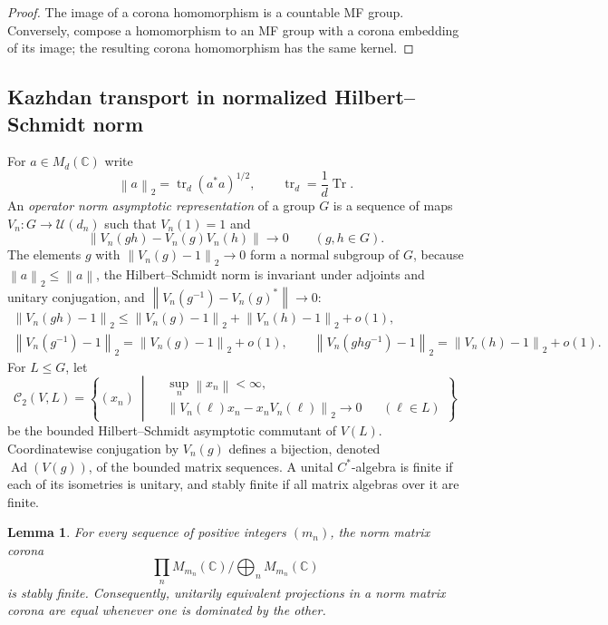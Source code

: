 \documentclass[11pt]{amsart}
\newcommand{\leanverified}[2]{\ignorespaces}
\newtheorem{lemma}[theorem]{Lemma}
\theoremstyle{plain}
\newcommand{\C}{\mathbb C}
\newcommand{\U}{\mathcal U}
\newcommand{\tr}{\operatorname{tr}}
\newcommand{\opnorm}[1]{\left\lVert #1\right\rVert}
\newcommand{\hsnorm}[1]{\left\lVert #1\right\rVert_2}
\begin{document}
\begin{proof}
The image of a corona homomorphism is a countable MF group.  Conversely,
compose a homomorphism to an MF group with a corona embedding of its image;
the resulting corona homomorphism has the same kernel.
\end{proof}

\subsection{Kazhdan transport in normalized Hilbert--Schmidt norm}

For $a\in M_d(\C)$ write
\[
 \hsnorm{a}=\tr_d(a^*a)^{1/2},
 \qquad \tr_d=\frac1d\operatorname{Tr}.
\]
An \emph{operator norm asymptotic representation} of a group $G$
is a sequence of maps $V_n\colon G\to\U(d_n)$ such that $V_n(1)=1$ and
\[
 \opnorm{V_n(gh)-V_n(g)V_n(h)}\longrightarrow0
 \qquad(g,h\in G).
\]
The elements $g$ with $\hsnorm{V_n(g)-1}\to0$ form a normal subgroup of
$G$, because $\hsnorm{a}\le\opnorm{a}$, the Hilbert--Schmidt norm is
invariant under adjoints and unitary conjugation, and
$\opnorm{V_n(g^{-1})-V_n(g)^*}\to0$:
\begin{gather*}
 \hsnorm{V_n(gh)-1}\le\hsnorm{V_n(g)-1}+\hsnorm{V_n(h)-1}+o(1),\\
 \hsnorm{V_n(g^{-1})-1}=\hsnorm{V_n(g)-1}+o(1),\qquad
 \hsnorm{V_n(ghg^{-1})-1}=\hsnorm{V_n(h)-1}+o(1).
\end{gather*}
For $L\le G$, let
\[
 \mathcal C_2(V,L)
 =\left\{(x_n)\ \middle|\
   \begin{aligned}
    &\sup_n\opnorm{x_n}<\infty,\\
    &\hsnorm{V_n(\ell)x_n-x_nV_n(\ell)}\longrightarrow0 &&(\ell\in L)
   \end{aligned}\right\}
\]
be the bounded Hilbert--Schmidt asymptotic commutant of $V(L)$.  Coordinatewise
conjugation by $V_n(g)$ defines a bijection, denoted $\operatorname{Ad}(V(g))$,
of the bounded matrix sequences.
A unital $C^*$-algebra is finite if each of its isometries is unitary,
and stably finite if all matrix algebras over it are finite.

\begin{lemma}\label{lem:stable-finite}
For every sequence of positive integers $(m_n)$, the norm matrix corona
\[
 \prod_nM_{m_n}(\C)\big/\bigoplus_nM_{m_n}(\C)
\]
is stably finite.  Consequently, unitarily equivalent projections in a norm
matrix corona are equal whenever one is dominated by the other.
\leanverified{Manuscript/OneSidedMFRadical/StableFiniteness}{GroupApproximation.Manuscript.OneSidedMFRadical.manuscriptNormMatrixCoronaStableFinite}
\end{lemma}
\end{document}
